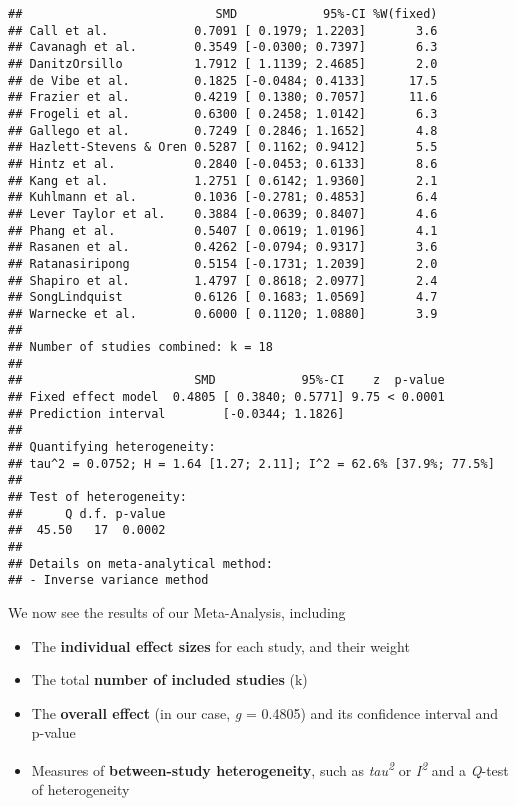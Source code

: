 \documentclass[]{book}
\providecommand{\tightlist}{%
  \setlength{\itemsep}{0pt}\setlength{\parskip}{0pt}}
\theoremstyle{definition}
\theoremstyle{definition}
\theoremstyle{definition}
\theoremstyle{remark}
\begin{document}
\begin{verbatim}
##                           SMD            95%-CI %W(fixed)
## Call et al.            0.7091 [ 0.1979; 1.2203]       3.6
## Cavanagh et al.        0.3549 [-0.0300; 0.7397]       6.3
## DanitzOrsillo          1.7912 [ 1.1139; 2.4685]       2.0
## de Vibe et al.         0.1825 [-0.0484; 0.4133]      17.5
## Frazier et al.         0.4219 [ 0.1380; 0.7057]      11.6
## Frogeli et al.         0.6300 [ 0.2458; 1.0142]       6.3
## Gallego et al.         0.7249 [ 0.2846; 1.1652]       4.8
## Hazlett-Stevens & Oren 0.5287 [ 0.1162; 0.9412]       5.5
## Hintz et al.           0.2840 [-0.0453; 0.6133]       8.6
## Kang et al.            1.2751 [ 0.6142; 1.9360]       2.1
## Kuhlmann et al.        0.1036 [-0.2781; 0.4853]       6.4
## Lever Taylor et al.    0.3884 [-0.0639; 0.8407]       4.6
## Phang et al.           0.5407 [ 0.0619; 1.0196]       4.1
## Rasanen et al.         0.4262 [-0.0794; 0.9317]       3.6
## Ratanasiripong         0.5154 [-0.1731; 1.2039]       2.0
## Shapiro et al.         1.4797 [ 0.8618; 2.0977]       2.4
## SongLindquist          0.6126 [ 0.1683; 1.0569]       4.7
## Warnecke et al.        0.6000 [ 0.1120; 1.0880]       3.9
## 
## Number of studies combined: k = 18
## 
##                        SMD            95%-CI    z  p-value
## Fixed effect model  0.4805 [ 0.3840; 0.5771] 9.75 < 0.0001
## Prediction interval        [-0.0344; 1.1826]              
## 
## Quantifying heterogeneity:
## tau^2 = 0.0752; H = 1.64 [1.27; 2.11]; I^2 = 62.6% [37.9%; 77.5%]
## 
## Test of heterogeneity:
##      Q d.f. p-value
##  45.50   17  0.0002
## 
## Details on meta-analytical method:
## - Inverse variance method
\end{verbatim}

We now see the results of our Meta-Analysis, including

\begin{itemize}
\tightlist
\item
  The \textbf{individual effect sizes} for each study, and their weight
\item
  The total \textbf{number of included studies} (k)
\item
  The \textbf{overall effect} (in our case, \emph{g} = 0.4805) and its
  confidence interval and p-value
\item
  Measures of \textbf{between-study heterogeneity}, such as
  \emph{tau\textsuperscript{2}} or \emph{I\textsuperscript{2}} and a
  \emph{Q}-test of heterogeneity
\end{itemize}
\end{document}
